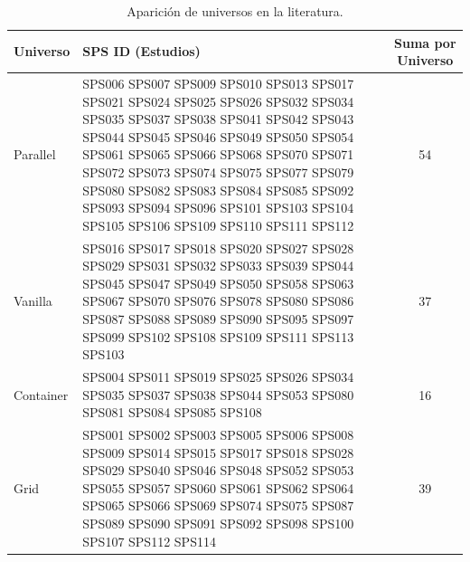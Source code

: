 \begin{table}[H]
	\centering
	\renewcommand{\arraystretch}{1.2} %
	\fontsize{9pt}{10pt}\selectfont %
	\caption{Aparición de universos en la literatura.}
	\label{tab:aparicion_universos}
	\begin{tabular}{|l|p{8cm}|c|}
		\hline
		\textbf{Universo} & \textbf{SPS ID (Estudios)}                                                                                                                                                                                                                                                                                                                                                                       & \textbf{Suma por Universo} \\
		\hline
		Parallel          & \tiny{SPS006 SPS007 SPS009 SPS010 SPS013 SPS017 SPS021 SPS024 SPS025 SPS026 SPS032 SPS034 SPS035 SPS037 SPS038 SPS041 SPS042 SPS043 SPS044 SPS045 SPS046 SPS049 SPS050 SPS054 SPS061 SPS065 SPS066 SPS068 SPS070 SPS071 SPS072 SPS073 SPS074 SPS075 SPS077 SPS079 SPS080 SPS082 SPS083 SPS084 SPS085 SPS092 SPS093 SPS094 SPS096 SPS101 SPS103 SPS104 SPS105 SPS106 SPS109 SPS110 SPS111 SPS112} & 54                         \\
		\hline
		Vanilla           & \tiny{SPS016 SPS017 SPS018 SPS020 SPS027 SPS028 SPS029 SPS031 SPS032 SPS033 SPS039 SPS044 SPS045 SPS047 SPS049 SPS050 SPS058 SPS063 SPS067 SPS070 SPS076 SPS078 SPS080 SPS086 SPS087 SPS088 SPS089 SPS090 SPS095 SPS097 SPS099 SPS102 SPS108 SPS109 SPS111 SPS113 SPS103}                                                                                                                        & 37                         \\
		\hline
		Container         & \tiny{SPS004 SPS011 SPS019 SPS025 SPS026 SPS034 SPS035 SPS037 SPS038 SPS044 SPS053 SPS080 SPS081 SPS084 SPS085 SPS108}                                                                                                                                                                                                                                                                           & 16                         \\
		\hline
		Grid              & \tiny{SPS001 SPS002 SPS003 SPS005 SPS006 SPS008 SPS009 SPS014 SPS015 SPS017 SPS018 SPS028 SPS029 SPS040 SPS046 SPS048 SPS052 SPS053 SPS055 SPS057 SPS060 SPS061 SPS062 SPS064 SPS065 SPS066 SPS069 SPS074 SPS075 SPS087 SPS089 SPS090 SPS091 SPS092 SPS098 SPS100 SPS107 SPS112 SPS114}                                                                                                          & 39                         \\

\end{tabular}
\end{table}
